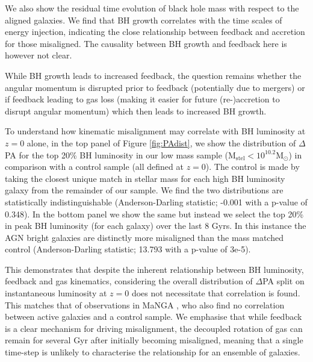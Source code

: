 \documentclass[fleqn,usenatbib]{mnras}
\begin{document}
We also show the residual time evolution of black hole mass with respect to the aligned galaxies. We find that BH growth correlates with the time scales of energy injection, indicating the close relationship between feedback and accretion for those misaligned. The causality between BH growth and feedback here is however not clear.

While BH growth leads to increased feedback, the question remains whether the angular momentum is disrupted prior to feedback (potentially due to mergers) or if feedback leading to gas loss (making it easier for future (re-)accretion to disrupt angular momentum) which then leads to increased BH growth.


To understand how kinematic misalignment may correlate with BH luminosity at $z=0$ alone, in the top panel of Figure \ref{fig:PAdist}, we show the distribution of $\Delta$PA for the top 20\% BH luminosity in our low mass sample ($\mathrm{M_{stel} < 10^{10.2}M_{\odot}}$) in comparison with a control sample (all defined at $z=0$). The control is made by taking the closest unique match in stellar mass for each high BH luminosity galaxy from the remainder of our sample. We find the two distributions are statistically indistinguishable (Anderson-Darling statistic; -0.001 with a p-value of 0.348). In the bottom panel we show the same but instead we select the top 20\% in peak BH luminosity (for each galaxy) over the last 8 Gyrs. In this instance the AGN bright galaxies are distinctly more misaligned than the mass matched control (Anderson-Darling statistic; 13.793 with a p-value of 3e-5). 

This demonstrates that despite the inherent relationship between BH luminosity, feedback and gas kinematics, considering the overall distribution of $\Delta$PA split on instantaneous luminosity at $z=0$ does not necessitate that correlation is found. This matches that of observations in MaNGA \citep[Figure 6 in][]{ilha2019}, who also find no correlation between active galaxies and a control sample. We emphasise that while feedback is a clear mechanism for driving misalignment, the decoupled rotation of gas can remain for several Gyr after initially becoming misaligned, meaning that a single time-step is unlikely to characterise the relationship for an ensemble of galaxies. 
\end{document}
